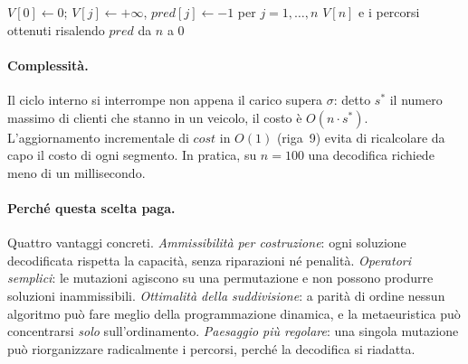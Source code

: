 \documentclass[10pt,a4paper]{article}
\begin{document}
\begin{algorithm}[H]
\SetAlgoLined
\DontPrintSemicolon
{}
$V[0] \leftarrow 0$; \quad $V[j] \leftarrow +\infty$, \; $\mathit{pred}[j] \leftarrow -1$ \quad per $j=1,\dots,n$\;
\Return $V[n]$ e i percorsi ottenuti risalendo $\mathit{pred}$ da $n$ a $0$\;
\caption{\textsc{Split} --- suddivisione ottima di un giant tour (Bellman su DAG)}
\label{alg:split}
\end{algorithm}

\paragraph{Complessità.} Il ciclo interno si interrompe non appena il carico
supera $\sigma$: detto $s^{*}$ il numero massimo di clienti che stanno in un
veicolo, il costo è $O(n \cdot s^{*})$. L'aggiornamento incrementale di
$\mathit{cost}$ in $O(1)$ (riga~9) evita di ricalcolare da capo il costo di ogni
segmento. In pratica, su $n=100$ una decodifica richiede meno di un millisecondo.

\paragraph{Perché questa scelta paga.} Quattro vantaggi concreti.
\emph{Ammissibilità per costruzione}: ogni soluzione decodificata rispetta la
capacità, senza riparazioni né penalità. \emph{Operatori semplici}: le mutazioni
agiscono su una permutazione e non possono produrre soluzioni inammissibili.
\emph{Ottimalità della suddivisione}: a parità di ordine nessun algoritmo può fare
meglio della programmazione dinamica, e la metaeuristica può concentrarsi
\emph{solo} sull'ordinamento. \emph{Paesaggio più regolare}: una singola mutazione
può riorganizzare radicalmente i percorsi, perché la decodifica si riadatta.
\end{document}
